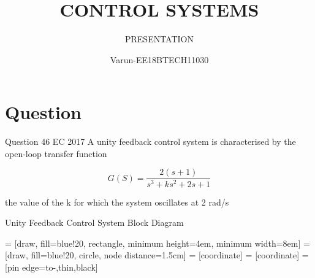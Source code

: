 \documentclass{beamer}
\title[GATE\_PROBLEM]{CONTROL SYSTEMS}
\subtitle{PRESENTATION}
\author{Varun-EE18BTECH11030}
\begin{document}
\begin{frame}
\titlepage    
\end{frame}

\section{Question}
\begin{frame}{Question 46 EC 2017}
A unity feedback control system is characterised by the open-loop transfer function\\
\begin{centre}
$$
 G(S) = \frac{2(s+1)}{s^3 + ks^2 + 2s +1}
$$
\end{centre}

the value of the k for which the system oscillates at 2 rad/s \\

\end{frame}
\begin{frame}{Unity Feedback Control System Block Diagram}
\begin{centre}


 = [draw, fill=blue!20, rectangle, 
    minimum height=4em, minimum width=8em]
 = [draw, fill=blue!20, circle, node distance=1.5cm]
 = [coordinate]
 = [coordinate]
 = [pin edge={to-,thin,black}]



\end{centre}

    
\end{frame}
\end{document}

